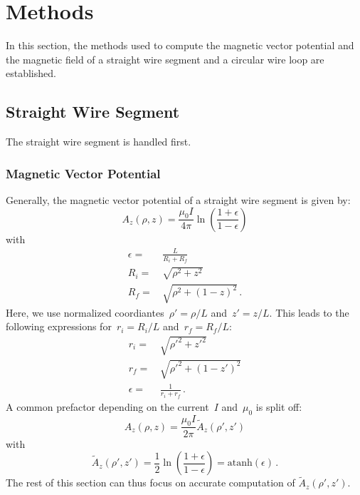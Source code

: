 \section{Methods}
\label{sec:methods}
In this section, the methods used to compute the magnetic vector potential and the magnetic field
of a straight wire segment and a circular wire loop are established.

\subsection{Straight Wire Segment}
The straight wire segment is handled first.

\subsubsection{Magnetic Vector Potential}
Generally, the magnetic vector potential of a straight wire segment is given by:
\begin{equation}
  A_z(\rho, z) = \frac{\mu_0 I}{4 \pi} \ln \left( \frac{1+\epsilon}{1 - \epsilon} \right)
\end{equation}
with
\begin{align}
  \epsilon =&\, \frac{L}{R_i + R_f} \\
       R_i =&\, \sqrt{\rho^2 + z^2} \\
       R_f =&\, \sqrt{\rho^2 + (1-z)^2} \, .
\end{align}
Here, we use normalized coordiantes~$\rho' = \rho/L$ and~$z' = z/L$.
This leads to the following expressions for~$r_i = R_i/L$ and~$r_f = R_f/L$:
\begin{align}
  r_i =&\, \sqrt{{\rho'}^2 +      {z'}^2 } \label{eqn:r_i_default} \\
  r_f =&\, \sqrt{{\rho'}^2 + (1 - {z'})^2} \label{eqn:r_f_default} \\
  \epsilon =&\, \frac{1}{r_i + r_f} \, .
\end{align}
A common prefactor depending on the current~$I$ and~$\mu_0$ is split off:
\begin{equation}
  A_z(\rho, z) = \frac{\mu_0 I}{2 \pi} \tilde{A}_z (\rho', z')
\end{equation}
with
\begin{equation}
  \tilde{A}_z (\rho', z')
  = \frac{1}{2} \ln \left( \frac{1+\epsilon}{1 - \epsilon} \right)
  = \textrm{atanh} (\epsilon) \, .
  \label{eqn:A_z_tilde}
\end{equation}
The rest of this section can thus focus on accurate computation of $\tilde{A}_z (\rho', z')$.

